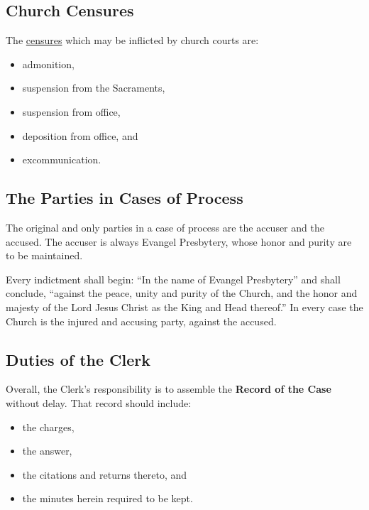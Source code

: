 \documentclass[
]{book}
\providecommand{\tightlist}{%
  \setlength{\itemsep}{0pt}\setlength{\parskip}{0pt}}
\begin{document}
\hypertarget{church-censures}{%
\subsection{Church Censures}\label{church-censures}}

The \href{https://evangel.pressbooks.com/chapter/33-church-censures/}{censures} which may be inflicted by church courts are:

\begin{itemize}
\tightlist
\item
  admonition,
\item
  suspension from the Sacraments,
\item
  suspension from office,
\item
  deposition from office, and
\item
  excommunication.
\end{itemize}

\hypertarget{the-parties-in-cases-of-process}{%
\subsection{The Parties in Cases of Process}\label{the-parties-in-cases-of-process}}

The original and only parties in a case of process are the accuser and the accused. The accuser is always Evangel Presbytery, whose honor and purity are to be maintained.

Every indictment shall begin: ``In the name of Evangel Presbytery'' and shall conclude, ``against the peace, unity and purity of the Church, and the honor and majesty of the Lord Jesus Christ as the King and Head thereof.'' In every case the Church is the injured and accusing party, against the accused.

\hypertarget{duties-of-the-clerk}{%
\subsection{Duties of the Clerk}\label{duties-of-the-clerk}}

Overall, the Clerk's responsibility is to assemble the \textbf{Record of the Case} without delay. That record should include:

\begin{itemize}
\tightlist
\item
  the charges,
\item
  the answer,
\item
  the citations and returns thereto, and
\item
  the minutes herein required to be kept.
\end{itemize}
\end{document}

